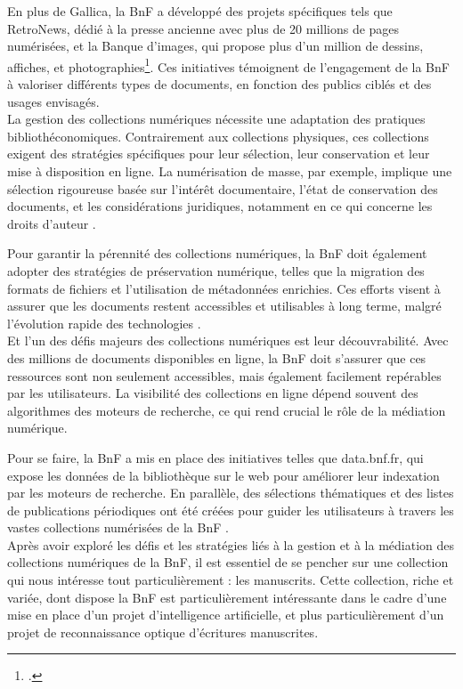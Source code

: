 \documentclass[a4paper,12pt,twoside]{book}
\begin{document}
	En plus de Gallica, la BnF a développé des projets spécifiques tels que RetroNews, dédié à la presse ancienne avec plus de 20 millions de pages numérisées, et la Banque d’images, qui propose plus d’un million de dessins, affiches, et photographies\footcite{leroy-terquem_milles_2023}. Ces initiatives témoignent de l’engagement de la BnF à valoriser différents types de documents, en fonction des publics ciblés et des usages envisagés.
	\\
	
	La gestion des collections numériques nécessite une adaptation des pratiques bibliothéconomiques. Contrairement aux collections physiques, ces collections exigent des stratégies spécifiques pour leur sélection, leur conservation et leur mise à disposition en ligne. La numérisation de masse, par exemple, implique une sélection rigoureuse basée sur l’intérêt documentaire, l’état de conservation des documents, et les considérations juridiques, notamment en ce qui concerne les droits d’auteur .
	
	Pour garantir la pérennité des collections numériques, la BnF doit également adopter des stratégies de préservation numérique, telles que la migration des formats de fichiers et l’utilisation de métadonnées enrichies. Ces efforts visent à assurer que les documents restent accessibles et utilisables à long terme, malgré l’évolution rapide des technologies .
	\\
	
	Et l’un des défis majeurs des collections numériques est leur découvrabilité. Avec des millions de documents disponibles en ligne, la BnF doit s’assurer que ces ressources sont non seulement accessibles, mais également facilement repérables par les utilisateurs. La visibilité des collections en ligne dépend souvent des algorithmes des moteurs de recherche, ce qui rend crucial le rôle de la médiation numérique.
	
	Pour se faire, la BnF a mis en place des initiatives telles que data.bnf.fr, qui expose les données de la bibliothèque sur le web pour améliorer leur indexation par les moteurs de recherche. En parallèle, des sélections thématiques et des listes de publications périodiques ont été créées pour guider les utilisateurs à travers les vastes collections numérisées de la BnF .
	\\
	
	Après avoir exploré les défis et les stratégies liés à la gestion et à la médiation des collections numériques de la BnF, il est essentiel de se pencher sur une collection qui nous intéresse tout particulièrement : les manuscrits. Cette collection, riche et variée, dont dispose la BnF est particulièrement intéressante dans le cadre d’une mise en place d’un projet d’intelligence artificielle, et plus particulièrement d’un projet de reconnaissance optique d’écritures manuscrites. 
	
\end{document}
